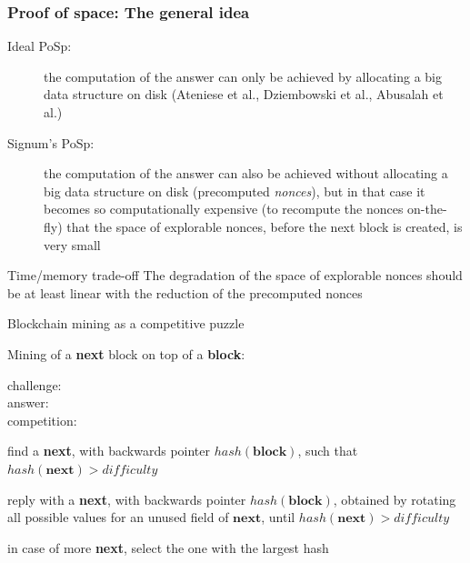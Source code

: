 \documentclass[11pt]{beamer}  %
\newcommand{\hash}{{\mathit{hash}}}
\newcommand{\difficulty}{{\mathit{difficulty}}}
\begin{document}
\begin{frame}\frametitle{Proof of space: The general idea}

  \begin{description}
  \item[Ideal PoSp:] the computation of the answer can only be achieved by allocating
    a big data structure on disk (Ateniese et al., Dziembowski et al., Abusalah et al.)
    \medskip
  \item[Signum's PoSp:] the computation of the answer can also be achieved without
    allocating a big data structure on disk (precomputed \emph{nonces}),
    but in that case it becomes so
    computationally expensive (to recompute the nonces on-the-fly)
    that the space of explorable nonces, before the next block is created, is very small
  \end{description}

  \bigskip
  
  \begin{redbox}{Time/memory trade-off}
    The degradation of the space of explorable nonces should be at least linear with
    the reduction of the precomputed nonces
  \end{redbox}

\end{frame}

\begin{frame}{Blockchain mining as a competitive puzzle}

  Mining of a \textbf{next} block on top of a \textbf{block}:

  \begin{description}
  \item[{\color{red}challenge:}] 
  \item[{\color{red}answer:}] 
  \item[{\color{red}competition:}] 
  \end{description}

  \bigskip
  \begin{description}
  \item<6->[{\color{red}challenge:}] find a \textbf{next}, with backwards pointer $\hash(\mathbf{block})$,
    such that $\hash(\mathbf{next})>\difficulty$
  \item<7->[{\color{red}answer:}] reply with a \textbf{next}, with backwards pointer $\hash(\mathbf{block})$, obtained
    by rotating all possible values for an unused field of $\mathbf{next}$, until $\hash(\mathbf{next})>\difficulty$
  \item<8->[{\color{red}competition:}] in case of more \textbf{next}, select the one with the largest hash
  \end{description}

\end{frame}
\end{document}
